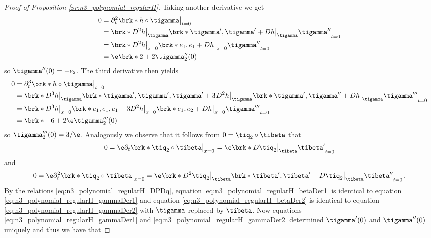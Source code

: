 \begin{proof}[Proof of Proposition \ref{pr:n3_polynomial_regularH}]
  Taking another derivative we get
  \begin{align}
    \begin{aligned}
    0&=\partial_t^2\brk*{h\circ\tigamma}\big\vert_{t=0}  \\
    &=\brk*{D^2h\big\vert_{\tigamma}\brk*{\tigamma',\tigamma'}+Dh\big\vert_{\tigamma}\tigamma''}_{t=0} \\
    &=\brk*{D^2h\big\vert_{x=0}\brk*{e_1,e_1}+Dh\big\vert_{x=0}\tigamma''}_{t=0} \\
    &=\e\brk*{2+2\tigamma_2''}(0)
    \end{aligned}
    \label{eq:n3_polynomial_regularH_gammaDer2}
  \end{align}
  so $\tigamma''(0)=-e_2$.
  The third derivative then yields
  \begin{align*}
    0&=\partial_t^3\brk*{h\circ\tigamma}\big\vert_{t=0} \\
    &=\brk*{D^3h\big\vert_{\tigamma}\brk*{\tigamma',\tigamma',\tigamma'}
    +3D^2h\big\vert_{\tigamma}\brk*{\tigamma',\tigamma''}
    +Dh\big\vert_{\tigamma}\tigamma'''}_{t=0} \\
    &=\brk*{D^3h\big\vert_{x=0}\brk*{e_1,e_1,e_1}
    -3D^2h\big\vert_{x=0}\brk*{e_1,e_2}
    +Dh\big\vert_{x=0}\tigamma'''}_{t=0} \\
    &=\brk*{-6+2\e\tigamma_2'''}(0)
  \end{align*}
  so $\tigamma_2'''(0)=3/\e$.
  Analogously we observe that it follows from $0=\tiq_2\circ\tibeta$ that
  \begin{align}
    0=\e\partial_t\brk*{\tiq_2\circ\tibeta}\big\vert_{x=0}
    =\e\brk*{D\tiq_2\big\vert_{\tibeta}\tibeta'}_{t=0}
    \label{eq:n3_polynomial_regularH_betaDer1}
  \end{align}
  and
  \begin{align}
    0=\e\partial_t^2\brk*{\tiq_2\circ\tibeta}\big\vert_{x=0}
    =\e\brk*{D^2\tiq_2\big\vert_{\tibeta}\brk*{\tibeta',\tibeta'}+D\tiq_2\big\vert_{\tibeta}\tibeta''}_{t=0}\,.
    \label{eq:n3_polynomial_regularH_betaDer2}
  \end{align}
  By the relations \eqref{eq:n3_polynomial_regularH_DPDq}, equation \eqref{eq:n3_polynomial_regularH_betaDer1} is identical to
  equation \eqref{eq:n3_polynomial_regularH_gammaDer1} 
  and equation  \eqref{eq:n3_polynomial_regularH_betaDer2} is identical to equation 
  \eqref{eq:n3_polynomial_regularH_gammaDer2} with $\tigamma$ replaced by $\tibeta$.
  Now equations  \eqref{eq:n3_polynomial_regularH_gammaDer1} and  \eqref{eq:n3_polynomial_regularH_gammaDer2}
  determined $\tigamma'(0)$ and $\tigamma''(0)$ uniquely and thus we have that

\end{proof}
